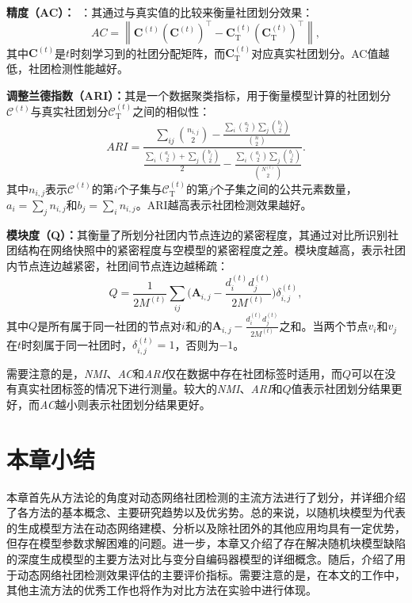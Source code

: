 \textbf{精度（AC）：}~\cite{folino2013evolutionary}：其通过与真实值的比较来衡量社团划分效果：
     \begin{equation}
       AC = \left \| \mathbf{C}^{(t)}(\mathbf{C}^{(t)})^{\top}-\mathbf{C}_{\mathrm{T}}^{(t)}(\mathbf{C}_{\mathrm{T}}^{(t)})^{\top} \right \|,
      \end{equation}
其中$\mathbf{C}^{(t)}$是$t$时刻学习到的社团分配矩阵，而$\mathbf{C}_{\mathrm{T}}^{(t)}$对应真实社团划分。AC值越低，社团检测性能越好。

\textbf{调整兰德指数（ARI）：}其是一个数据聚类指标，用于衡量模型计算的社团划分$\mathcal{C}^{(t)}$与真实社团划分$\mathcal{C}_{\mathrm{T}}^{(t)}$之间的相似性：
     \begin{equation}
      ARI = \dfrac{\sum_{ij}\binom{n_{i,j}}{2}-
      \frac{\sum_{i}\binom{a_{i}}{2} \sum_{j}\binom{b_{j}}{2}}{\binom{n}{2}}}{\frac{ \sum_{i}\binom{a_{i}}{2}+ \sum_{j}\binom{b_{j}}{2} }{2}-\frac{\sum_{i}\binom{a_{i}}{2} \sum_{j}\binom{b_{j}}{2}}{\binom{N^{(t)}}{2}}}.
      \end{equation}
其中$n_{i,j}$表示$\mathcal{C}^{(t)}$的第$i$个子集与$\mathcal{C}_{\mathrm{T}}^{(t)}$的第$j$个子集之间的公共元素数量，$a_i = \sum_{j}n_{i,j}$和$b_j = \sum_{i}n_{i,j}$。ARI越高表示社团检测效果越好。

\textbf{模块度（Q）：}其衡量了所划分社团内节点连边的紧密程度，其通过对比所识别社团结构在网络快照中的紧密程度与空模型的紧密程度之差。模块度越高，表示社团内节点连边越紧密，社团间节点连边越稀疏：
     \begin{equation}
       Q = \frac{1}{2M^{(t)}}\sum_{ij}\bigg( \mathbf{A}_{i,j}-\frac{d_{i}^{(t)}d_{j}^{(t)}}{2M^{(t)}} \bigg)\delta_{i,j}^{(t)},
      \end{equation}
其中$Q$是所有属于同一社团的节点对$i$和$j$的$ \mathbf{A}_{i,j}-\frac{d_{i}^{(t)}d_{j}^{(t)}}{2M^{(t)}}$之和。当两个节点$v_i$和$v_j$在$t$时刻属于同一社团时，$\delta_{i,j}^{(t)}=1$，否则为$-1$。

需要注意的是，\emph{NMI}、\emph{AC}和\emph{ARI}仅在数据中存在社团标签时适用，而$Q$可以在没有真实社团标签的情况下进行测量。较大的\emph{NMI}、\emph{ARI}和$Q$值表示社团划分结果更好，而\emph{AC}越小则表示社团划分结果更好。

\section{本章小结}
本章首先从方法论的角度对动态网络社团检测的主流方法进行了划分，并详细介绍了各方法的基本概念、主要研究趋势以及优劣势。总的来说，以随机块模型为代表的生成模型方法在动态网络建模、分析以及除社团外的其他应用均具有一定优势，但存在模型参数求解困难的问题。进一步，本章又介绍了存在解决随机块模型缺陷的深度生成模型的主要方法对比与变分自编码器模型的详细概念。随后，介绍了用于动态网络社团检测效果评估的主要评价指标。需要注意的是，在本文的工作中，其他主流方法的优秀工作也将作为对比方法在实验中进行体现。

